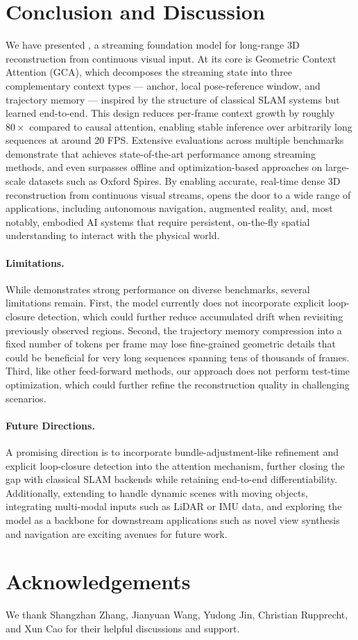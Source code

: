 \section{Conclusion and Discussion}
\label{sec:conclusion}

We have presented \method, a streaming foundation model for long-range 3D reconstruction from continuous visual input.
At its core is Geometric Context Attention (GCA), which decomposes the streaming state into three complementary context types — anchor, local pose-reference window, and trajectory memory — inspired by the structure of classical SLAM systems but learned end-to-end.
This design reduces per-frame context growth by roughly $80{\times}$ compared to causal attention, enabling stable inference over arbitrarily long sequences at around 20 FPS.
Extensive evaluations across multiple benchmarks demonstrate that \method achieves state-of-the-art performance among streaming methods, and even surpasses offline and optimization-based approaches on large-scale datasets such as Oxford Spires.
By enabling accurate, real-time dense 3D reconstruction from continuous visual streams, \method opens the door to a wide range of applications, including autonomous navigation, augmented reality, and, most notably, embodied AI systems that require persistent, on-the-fly spatial understanding to interact with the physical world.

\paragraph{Limitations.}
While \method demonstrates strong performance on diverse benchmarks, several limitations remain.
First, the model currently does not incorporate explicit loop-closure detection, which could further reduce accumulated drift when revisiting previously observed regions.
Second, the trajectory memory compression into a fixed number of tokens per frame may lose fine-grained geometric details that could be beneficial for very long sequences spanning tens of thousands of frames.
Third, like other feed-forward methods, our approach does not perform test-time optimization, which could further refine the reconstruction quality in challenging scenarios.

\paragraph{Future Directions.}
A promising direction is to incorporate bundle-adjustment-like refinement and explicit loop-closure detection into the attention mechanism, further closing the gap with classical SLAM backends while retaining end-to-end differentiability.
Additionally, extending \method to handle dynamic scenes with moving objects, integrating multi-modal inputs such as LiDAR or IMU data, and exploring the model as a backbone for downstream applications such as novel view synthesis and navigation are exciting avenues for future work.


\section*{Acknowledgements}
We thank Shangzhan Zhang, Jianyuan Wang, Yudong Jin, Christian Rupprecht, and Xun Cao for their helpful discussions and support.
